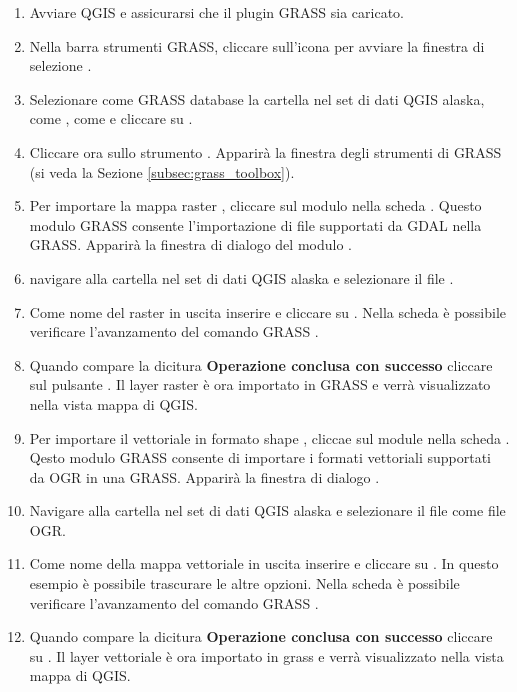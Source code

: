 \begin{enumerate}
  \item Avviare QGIS e assicurarsi che il plugin GRASS sia caricato.
  \item Nella barra strumenti GRASS, cliccare sull'icona
   per avviare la finestra di
  selezione .
  \item Selezionare come GRASS database la cartella  nel
  set di dati QGIS alaska, come , come
    e cliccare su .
  \item Cliccare ora sullo strumento . Apparirà la finestra degli strumenti di GRASS (si veda la Sezione
  \ref{subsec:grass_toolbox}).
  \item Per importare la mappa raster , cliccare sul
  modulo  nella scheda . Questo
  modulo GRASS consente l'importazione di file supportati da GDAL nella
   GRASS. Apparirà la finestra di dialogo del modulo
  .
  \item navigare alla cartella  nel set
  di dati QGIS alaska e selezionare il file .
  \item Come nome del raster in uscita inserire  e
  cliccare su . Nella scheda  è possibile
  verificare l'avanzamento del comando GRASS .
  \item Quando compare la dicitura \textbf{Operazione conclusa con successo}
  cliccare sul pulsante . Il layer raster
   è ora importato in GRASS e verrà visualizzato
  nella vista mappa di QGIS.
  \item Per importare il vettoriale in formato shape ,
  cliccae sul module  nella scheda .
  Qesto modulo GRASS consente di importare i formati vettoriali supportati da
  OGR in una  GRASS. Apparirà la finestra di dialogo .
  \item Navigare alla cartella  nel set di dati
  QGIS alaska e selezionare il file  come file OGR.
  \item Come nome della mappa vettoriale in uscita inserire
   e cliccare su . In questo esempio è
  possibile trascurare le altre opzioni. Nella scheda  è
  possibile verificare l'avanzamento del comando GRASS .
  \item Quando compare la dicitura \textbf{Operazione conclusa con successo}
  cliccare su . Il layer vettoriale
   è ora importato in grass e verrà visualizzato nella
  vista mappa di QGIS. 
\end{enumerate}


